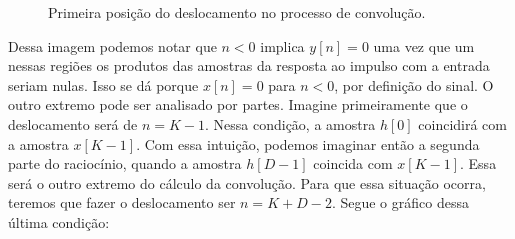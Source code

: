 \documentclass[x11names,a4paper,12pt]{article}
\begin{document}
\begin{figure}[H]
  \centering
  \caption{Primeira posição do deslocamento no processo de convolução.}
  \label{fig:begin_convolution}
\end{figure}

Dessa imagem podemos notar que $n<0$ implica $y[n]=0$ uma vez que um nessas regiões os produtos das amostras da resposta ao impulso com a entrada seriam nulas. Isso se dá porque $x[n]=0$ para $n<0$, por definição do sinal.
O outro extremo pode ser analisado por partes. Imagine primeiramente que o deslocamento será de $n=K-1$. Nessa condição, a amostra $h[0]$ coincidirá com a amostra $x[K-1]$. Com essa intuição, podemos imaginar então a segunda parte do raciocínio, quando a amostra $h[D-1]$ coincida com $x[K-1]$. Essa será o outro extremo do cálculo da convolução. Para que essa situação ocorra, teremos que fazer o deslocamento ser $n=K+D-2$. Segue o gráfico dessa última condição:
\end{document}
